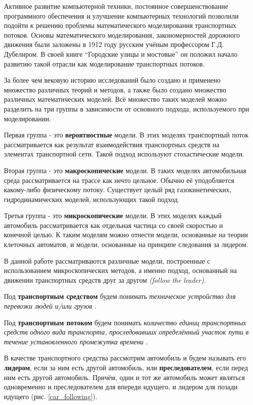 \documentclass[12pt, a4paper]{extarticle}
\numberwithin{equation}{section}
\numberwithin{figure}{section}
\begin{document}
Активное развитие компьютерной техники, постоянное совершенствование программного обеспечения и улучшение компьютерных технологий позволили подойти к решению проблемы математического моделирования транспортных потоков. Основы математического моделирования, закономерностей дорожного движения были заложены в 1912 году русским учёным профессором Г.Д. Дубелиром. В своей книге ``Городские улицы и мостовые'' \cite{Street} он положил начало развитию такой отрасли как моделирование транспортных потоков.

За более чем вековую историю исследований было создано и применено множество различных теорий и методов, а также было создано множество различных математических моделей. Всё множество таких моделей можно разделить на три группы в зависимости от основного подхода, используемого при моделировании.

Первая группа - это \textbf{вероятностные} модели. В этих моделях транспортный поток рассматривается как результат взаимодействия транспортных средств на элементах транспортной сети.
Такой подход используют стохастические модели.

Вторая группа - это \textbf{макроскопические} модели. В таких моделях автомобильная среда рассматривается на трассе как нечто цельное. Обычно её уподобляется какому-либо физическому потоку. Существует целый ряд газокинетических, гидродинамических моделей, использующих такой подход.

Третья группа - это \textbf{микроскопические} модели. В этих моделях каждый автомобиль рассматривается как отдельная частица со своей скоростью и конечной целью. К таким моделям можно отнести модели, основанные на теории клеточных автоматов, и модели, основанные на принципе следования за лидером.

В данной работе рассматриваются различные модели, построенные с использованием микроскопических методов, а именно подход, основанный на движении транспортных средств друг за другом {\it(follow the leader)}.

Под \textbf{транспортным средством} будем понимать {\it техническое устройство для перевозки людей и/или грузов} \cite{TrafficFlow}.

Под \textbf{транспортным потоком} будем понимать {\it количество единиц транспортных средств одного вида транспорта, проследовавших определённый участок пути в течение установленного промежутка времени} \cite{TrafficFlow}.

В качестве транспортного средства рассмотрим автомобиль и будем называть его \textbf{лидером}, если за ним есть другой автомобиль, или \textbf{преследователем}, если перед ним есть другой автомобиль. Причём, один и тот же автомобиль может являться одновременно и преследователем для впереди идущего, и лидером для позади идущего (рис. \ref{car_following}). 
\end{document}
